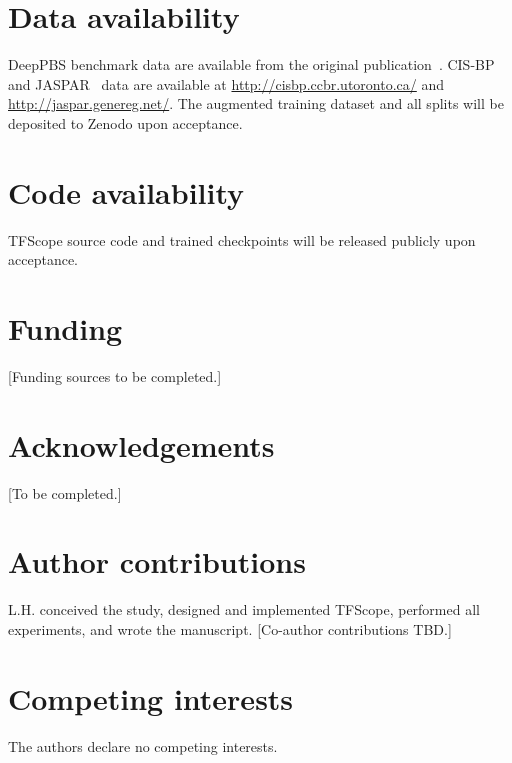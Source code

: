 \documentclass[11pt,letterpaper]{article}
\begin{document}
\section*{Data availability}
DeepPBS benchmark data are available from the original publication~\cite{Mitra2024}.
CIS-BP~\cite{Weirauch2014} and JASPAR~\cite{CastroMondragon2022} data are available
at \url{http://cisbp.ccbr.utoronto.ca/} and \url{http://jaspar.genereg.net/}. The
augmented training dataset and all splits will be deposited to Zenodo upon
acceptance.

\section*{Code availability}
TFScope source code and trained checkpoints will be released publicly upon
acceptance.

\section*{Funding}
[Funding sources to be completed.]

\section*{Acknowledgements}
[To be completed.]

\section*{Author contributions}
L.H. conceived the study, designed and implemented TFScope, performed all
experiments, and wrote the manuscript. [Co-author contributions TBD.]

\section*{Competing interests}
The authors declare no competing interests.




\clearpage
\setcounter{figure}{0}
\end{document}
